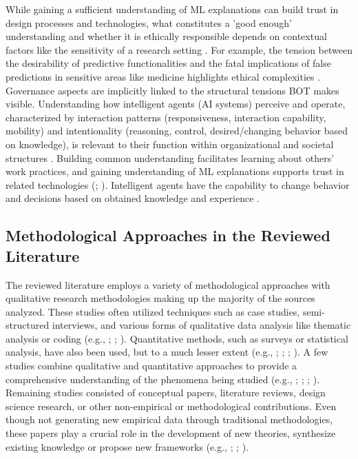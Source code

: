 \documentclass[12pt,oneside]{article}
\begin{document}
While gaining a sufficient understanding of \ac{ML} explanations can build trust in design processes and technologies, what constitutes a 'good enough' understanding and whether it is ethically responsible depends on contextual factors like the sensitivity of a research setting \citep[7]{ayobi2021machine}. For example, the tension between the desirability of predictive functionalities and the fatal implications of false predictions in sensitive areas like medicine highlights ethical complexities \citep[7]{ayobi2021machine}. Governance aspects are implicitly linked to the structural tensions \ac{BOT} makes visible. Understanding how intelligent agents (\ac{AI} systems) perceive and operate, characterized by interaction patterns (responsiveness, interaction capability, mobility) and intentionality (reasoning, control, desired/changing behavior based on knowledge), is relevant to their function within organizational and societal structures \citep[1156]{kot2020concept}. Building common understanding facilitates learning about others' work practices, and gaining understanding of \ac{ML} explanations supports trust in related technologies (\citealp[6145]{mayer2023managing}; \citealp[7]{ayobi2021machine}). Intelligent agents have the capability to change behavior and decisions based on obtained knowledge and experience \citep[1156]{kot2020concept}.

\subsection{Methodological Approaches in the Reviewed Literature} \label{methodological-approaches-in-the-reviewed-literature}

The reviewed literature employs a variety of methodological approaches with qualitative research methodologies making up the majority of the sources analyzed. These studies often utilized techniques such as case studies, semi-structured interviews, and various forms of qualitative data analysis like thematic analysis or coding (e.g., \citealp[315]{rosenkranz2014boundary}; \citealp[216]{corsaro2018crossing}; \citealp[4-5]{rahlmeier2024bridging}). \newline
Quantitative methods, such as surveys or statistical analysis, have also been used, but to a much lesser extent (e.g., \citealp[3-4]{prentice2023artificial}; \citealp[4]{gantman2011boundary}; \citealp[4]{gantman2014communication}; \citealp[30]{abson2014ecosystem}). \newline
A few studies combine qualitative and quantitative approaches to provide a comprehensive understanding of the phenomena being studied (e.g., \citealp[9, 12]{chung2023artinter}; \citealp[4-5]{bakhaev2023cocreating}; \citealp[6]{petrik2020boundary}; \citealp[7]{petrik2021exploring}). Remaining studies consisted of conceptual papers, literature reviews, design science research, or other non-empirical or methodological contributions. Even though not generating new empirical data through traditional methodologies, these papers play a crucial role in the development of new theories, synthesize existing knowledge or propose new frameworks (e.g., \citealp[5-6]{strübing1998bridging}; \citealp[5-6]{abraham2013enterprise}; \citealp[5-6]{folmer2014method}). 
\end{document}
